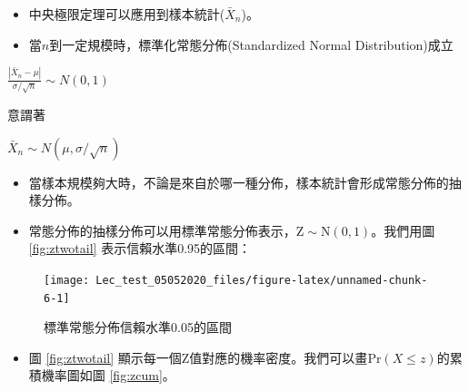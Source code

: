 \documentclass[hyperref,]{ctexart}
\providecommand{\tightlist}{%
  \setlength{\itemsep}{0pt}\setlength{\parskip}{0pt}}
\begin{document}
\begin{itemize}
\tightlist
\item
  中央極限定理可以應用到樣本統計(\(\bar{X}_{n}\))。
\item
  當\(n\)到一定規模時，標準化常態分佈(Standardized Normal
  Distribution)成立
\end{itemize}

\begin{center}
$\frac{|\bar{X}_{n}-\mu|}{\sigma/\sqrt{n}}\sim N(0,1)$
\end{center}

意謂著

\begin{center}
$\bar{X}_{n}\sim N(\mu,\sigma/\sqrt{n})$
\end{center}

\begin{itemize}
\item
  當樣本規模夠大時，不論是來自於哪一種分佈，樣本統計會形成常態分佈的抽樣分佈。
\item
  常態分佈的抽樣分佈可以用標準常態分佈表示，\(\text{Z}\sim \text{N}(0, 1)\)。我們用圖
  \ref{fig:ztwotail} 表示信賴水準0.95的區間：
\end{itemize}

\begin{figure}

\texttt{[image: Lec\_test\_05052020\_files/figure-latex/unnamed-chunk-6-1]} \hfill{}

\caption{\label{fig:ztwotail}標準常態分佈信賴水準0.05的區間}\label{fig:unnamed-chunk-6}
\end{figure}

\begin{itemize}
\tightlist
\item
  圖 \ref{fig:ztwotail}
  顯示每一個Z值對應的機率密度。我們可以畫\(\text{Pr}(X\leq z)\)的累積機率圖如圖
  \ref{fig:zcum}。
\end{itemize}
\end{document}
